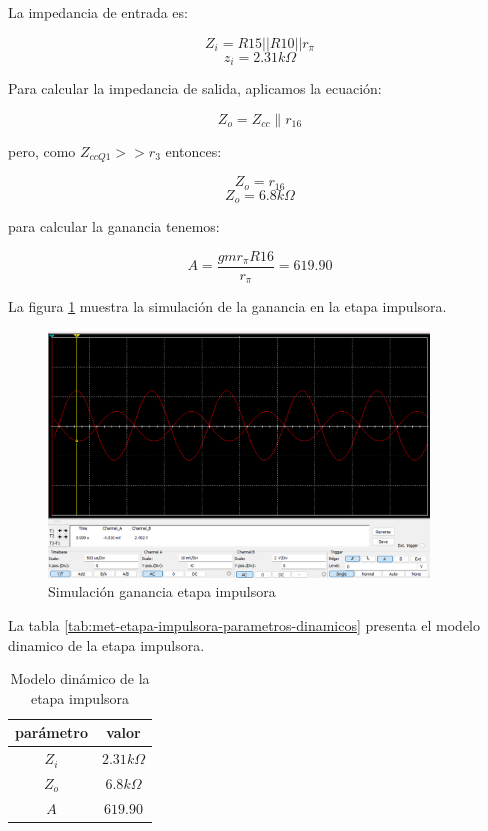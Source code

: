 La impedancia de entrada es:

$$Z_i = R15 || R10 || r_\pi $$
$$z_i = 2.31 k \Omega $$

Para calcular la impedancia de salida, aplicamos la ecuación:

$$ Z_o = Z_{cc} \parallel r_{16}$$

pero, como $Z_{ccQ1} >> r_3$ entonces:

$$ Z_o = r_{16} $$
$$ Z_o = 6.8k\Omega$$

para calcular la ganancia tenemos:

$$A = \frac{gmr_\pi R16}{r_\pi} = 619.90$$

La figura \ref{fig:sim-etapa-impulsora-ganancia} muestra la simulación de la ganancia en la etapa impulsora.

\begin{figure}[ht]
    \centering
    \includegraphics[width=0.9\textwidth]{src/images/p3/etapa-impulsora-ganancia.png}
    \caption{Simulación ganancia etapa impulsora}
    \label{fig:sim-etapa-impulsora-ganancia}
\end{figure}

La tabla \ref{tab:met-etapa-impulsora-parametros-dinamicos} presenta el modelo dinamico de la etapa impulsora.

\begin{table}[ht]
    \centering
    \begin{tabular}{|c|c|}
        \hline
        parámetro & valor  \\
        \hline
        $Z_i$ & $2.31k\Omega$ \\
        \hline
        $Z_o$ & $6.8k\Omega$ \\
        \hline
        $A$ & $619.90$ \\
        \hline
    \end{tabular}
    \caption{Modelo dinámico de la etapa impulsora}
    \label{tab:met-etapa-impulsora-modelo-dinamico}
\end{table}


